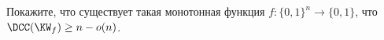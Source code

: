 Покажите, что существует такая монотонная функция $f: \{0, 1\}^n \to \{0, 1\}$, что 
$\DCC(\KW_f) \ge n - o(n)$. 